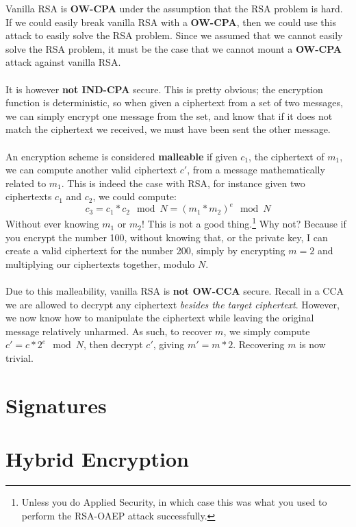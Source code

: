 		Vanilla RSA is \textbf{OW-CPA} under the assumption that the RSA problem is hard. If we could easily break vanilla RSA with a \textbf{OW-CPA}, then we could use this attack to easily solve the RSA problem. Since we assumed that we cannot easily solve the RSA problem, it must be the case that we cannot mount a \textbf{OW-CPA} attack against vanilla RSA.\\
		\\
		It is however \textbf{not IND-CPA} secure. This is pretty obvious; the encryption function is deterministic, so when given a ciphertext from a set of two messages, we can simply encrypt one message from the set, and know that if it does not match the ciphertext we received, we must have been sent the other message.\\
		\\
		An encryption scheme is considered \textbf{malleable} if given $c_1$, the ciphertext of $m_1$, we can compute another valid ciphertext $c'$, from a message mathematically related to $m_1$. This is indeed the case with RSA, for instance given two ciphertexts $c_1$ and $c_2$, we could compute:
		$$c_3 = c_1*c_2 \mod N = (m_1 * m_2)^e \mod N$$ 
		Without ever knowing $m_1$ or $m_2$! This is not a good thing.\footnote{Unless you do Applied Security, in which case this was what you used to perform the RSA-OAEP attack successfully.} Why not? Because if you encrypt the number 100, without knowing that, or the private key, I can create a valid ciphertext for the number 200, simply by encrypting $m = 2$ and multiplying our ciphertexts together, modulo $N$.\\
		\\
		Due to this malleability, vanilla RSA is \textbf{not OW-CCA} secure. Recall in a CCA we are allowed to decrypt any ciphertext \textit{besides the target ciphertext}. However, we now know how to manipulate the ciphertext while leaving the original message relatively unharmed. As such, to recover $m$, we simply compute $c' = c*2^e \mod N$, then decrypt $c'$, giving $m' = m * 2$. Recovering $m$ is now trivial.


\section{Signatures}



\section{Hybrid Encryption}

